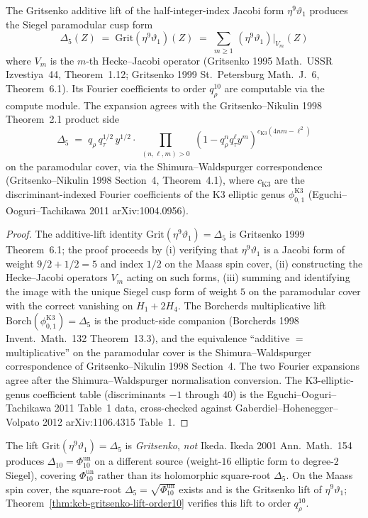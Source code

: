 \begin{theorem}
\label{thm:kcb-gritsenko-lift-order10}
The Gritsenko additive lift of the half-integer-index Jacobi form
$\eta^9\vartheta_1$ produces the Siegel paramodular cusp form
\[
 \Delta_5(Z)
 \;=\;
 \mathrm{Grit}(\eta^9\vartheta_1)(Z)
 \;=\;
 \sum_{m\geq 1}\,(\eta^9\vartheta_1)\big|_{V_m}(Z)
\]
where $V_m$ is the $m$-th Hecke--Jacobi operator (Gritsenko 1995
\textup{Math.~USSR Izvestiya}~44, Theorem~1.12; Gritsenko 1999
\textup{St.~Petersburg Math.~J.}~6, Theorem~6.1). Its Fourier
coefficients to order $q_\rho^{10}$ are computable via the compute
module. The
expansion agrees with the Gritsenko--Nikulin 1998 Theorem~2.1 product
side
\[
 \Delta_5
 \;=\;
 q_\rho\,q_\tau^{1/2}\,y^{1/2}\cdot
 \prod_{\substack{(n,\ell,m)>0}}
 (1 - q_\rho^n q_\tau^\ell y^m)^{c_{\mathrm{K3}}(4nm-\ell^2)}
\]
on the paramodular cover, via the Shimura--Waldspurger correspondence
(Gritsenko--Nikulin 1998 Section~4, Theorem~4.1), where
$c_{\mathrm{K3}}$ are the discriminant-indexed Fourier coefficients of
the K3 elliptic genus $\phi_{0,1}^{\mathrm{K3}}$
(Eguchi--Ooguri--Tachikawa 2011 \textup{arXiv:1004.0956}).
\end{theorem}

\begin{proof}
The additive-lift identity $\mathrm{Grit}(\eta^9\vartheta_1)=\Delta_5$
is Gritsenko 1999 Theorem~6.1; the proof proceeds by (i) verifying
that $\eta^9\vartheta_1$ is a Jacobi form of weight $9/2+1/2=5$ and
index $1/2$ on the Maass spin cover, (ii) constructing the Hecke--Jacobi
operators $V_m$ acting on such forms, (iii) summing and identifying
	the image with the unique Siegel cusp form of weight $5$ on the
	paramodular cover with the correct vanishing on $H_1+2H_4$.
The Borcherds multiplicative lift $\mathrm{Borch}(\phi_{0,1}^{\mathrm{K3}})
= \Delta_5$ is the product-side companion
(Borcherds 1998 \textup{Invent.~Math.}~132 Theorem~13.3), and the
equivalence ``additive $=$ multiplicative'' on the paramodular cover is
the Shimura--Waldspurger correspondence of
Gritsenko--Nikulin 1998 Section~4. The two Fourier expansions agree
after the Shimura--Waldspurger normalisation conversion.
The K3-elliptic-genus coefficient table (discriminants $-1$ through
$40$) is the Eguchi--Ooguri--Tachikawa 2011 Table~1 data, cross-checked
against Gaberdiel--Hohenegger--Volpato 2012
\textup{arXiv:1106.4315} Table~1.
\end{proof}

\begin{remark}
\label{rem:kcb-gritsenko-vs-ikeda}
The lift $\mathrm{Grit}(\eta^9\vartheta_1)=\Delta_5$ is
\emph{Gritsenko}, \emph{not} Ikeda. Ikeda 2001
\textup{Ann.~Math.}~154 produces \(\Delta_{10}=\Phi_{10}^{\mathrm{un}}\) on a
different source (weight-$16$ elliptic form to
degree-$2$ Siegel), covering \(\Phi_{10}^{\mathrm{un}}\) rather than its holomorphic
square-root $\Delta_5$. On the Maass spin cover, the square-root
\(\Delta_5=\sqrt{\Phi_{10}^{\mathrm{un}}}\) exists and is the Gritsenko lift of
$\eta^9\vartheta_1$; Theorem~\ref{thm:kcb-gritsenko-lift-order10}
verifies this lift to order $q_\rho^{10}$.
\end{remark}

